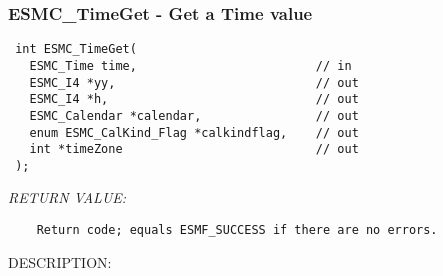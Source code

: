 
\setlength{\oldparskip}{\parskip}
\setlength{\parskip}{1.5ex}
\setlength{\oldparindent}{\parindent}
\setlength{\parindent}{0pt}
\setlength{\oldbaselineskip}{\baselineskip}
\setlength{\baselineskip}{11pt}
 
\def\bv{\begin{verbatim}}
\def\ev{\end{verbatim}}
\def\be{\begin{equation}}
\def\ee{\end{equation}}
\def\bea{\begin{eqnarray}}
\def\eea{\end{eqnarray}}
\def\bi{\begin{itemize}}
\def\ei{\end{itemize}}
\def\bn{\begin{enumerate}}
\def\en{\end{enumerate}}
\def\bd{\begin{description}}
\def\ed{\end{description}}
\def\({\left (}
\def\){\right )}
\def\[{\left [}
\def\]{\right ]}
\def\<{\left  \langle}
\def\>{\right \rangle}
\def\cI{{\cal I}}
\def\diag{\mathop{\rm diag}}
\def\tr{\mathop{\rm tr}}


 
\subsubsection [ESMC\_TimeGet] {ESMC\_TimeGet - Get a Time value}


  
\begin{verbatim} int ESMC_TimeGet(
   ESMC_Time time,                         // in
   ESMC_I4 *yy,                            // out
   ESMC_I4 *h,                             // out
   ESMC_Calendar *calendar,                // out
   enum ESMC_CalKind_Flag *calkindflag,    // out
   int *timeZone                           // out
 );
 \end{verbatim}{\em RETURN VALUE:}
\begin{verbatim}    Return code; equals ESMF_SUCCESS if there are no errors.\end{verbatim}
{\sf DESCRIPTION:\\ }


